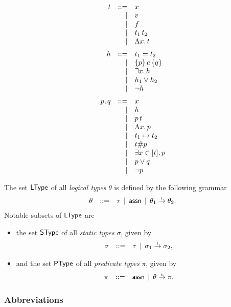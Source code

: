 \documentclass[12pt,a4paper]{report}
\begin{document}
\[\GRbeg
  t \GRis x
    \GRal v
    \GRal f
    \GRal \app{t_1}{t_2}
    \GRal \tabstr{x}{t}
    \GRnl

  h \GRis t_1 = t_2
    \GRal \triple{p}{e}{q}
    \GRal \qex{x}{h}
    \GRal h_1 \vee h_2
    \GRal \neg h
    \GRnl

  p,q \GRis x
      \GRal h
      \GRal \app{p}{t}
      \GRal \tabstr{x}{p}
      \GRal t_1 \mapsto t_2
      \GRal t \# p
      \GRal \qbex{x}{t}{p}
      \GRal p \vee q
      \GRal \neg p
\GRend\]

The set $\mathsf{LType}$ of all {\em logical types} $\theta$ is defined
by the following grammar
\[\begin{array}{rrlll}
  \theta & ::= & \tau \,\mid\, \mathsf{assn} \,\mid\, \theta_1\stackrel{_t}{\to}\theta_2.
\end{array}\]
Notable subsets of $\mathsf{LType}$ are
\begin{itemize}
  \item the set $\mathsf{SType}$ of all {\em static types} $\sigma$, given by
        \[\begin{array}{rrlll}
          \sigma & ::= & \tau \,\mid\, \sigma_1\stackrel{_t}{\to}\sigma_2,
        \end{array}\]

  \item and the set $\mathsf{PType}$ of all {\em predicate types} $\pi$, given by
        \[\begin{array}{rrlll}
          \pi & ::= & \mathsf{assn} \,\mid\, \theta\stackrel{_t}{\to}\pi.
        \end{array}\]
\end{itemize}

\subsubsection{Abbreviations}
\end{document}
